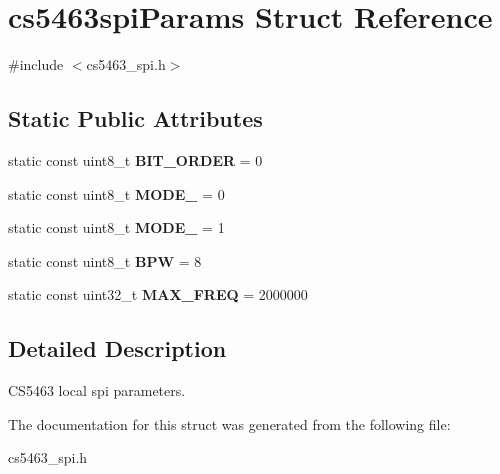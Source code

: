 \hypertarget{structcs5463spiParams}{\section{cs5463spi\-Params Struct Reference}
\label{structcs5463spiParams}
}


{\ttfamily \#include $<$cs5463\-\_\-spi.\-h$>$}

\subsection*{Static Public Attributes}
\begin{DoxyCompactItemize}
\item 
\hypertarget{structcs5463spiParams_ae2777803bb5b41ebe0a0d758d28f4ded}{static const uint8\-\_\-t {\bfseries B\-I\-T\-\_\-\-O\-R\-D\-E\-R} = 0}\label{structcs5463spiParams_ae2777803bb5b41ebe0a0d758d28f4ded}

\item 
\hypertarget{structcs5463spiParams_a4cd49ecac3420ed8a8e885f2868cb093}{static const uint8\-\_\-t {\bfseries M\-O\-D\-E\-\_} = 0}\label{structcs5463spiParams_a4cd49ecac3420ed8a8e885f2868cb093}

\item 
\hypertarget{structcs5463spiParams_a4d76eb638a9dd8ec0162fd6ccde5e81d}{static const uint8\-\_\-t {\bfseries M\-O\-D\-E\-\_} = 1}\label{structcs5463spiParams_a4d76eb638a9dd8ec0162fd6ccde5e81d}

\item 
\hypertarget{structcs5463spiParams_a381cde3229b78cf9502d44912898423b}{static const uint8\-\_\-t {\bfseries B\-P\-W} = 8}\label{structcs5463spiParams_a381cde3229b78cf9502d44912898423b}

\item 
\hypertarget{structcs5463spiParams_a63fd68edbc4069935ba250a29cc37f8d}{static const uint32\-\_\-t {\bfseries M\-A\-X\-\_\-\-F\-R\-E\-Q} = 2000000}\label{structcs5463spiParams_a63fd68edbc4069935ba250a29cc37f8d}

\end{DoxyCompactItemize}


\subsection{Detailed Description}
C\-S5463 local spi parameters. 

The documentation for this struct was generated from the following file\-:\begin{DoxyCompactItemize}
\item 
cs5463\-\_\-spi.\-h\end{DoxyCompactItemize}
